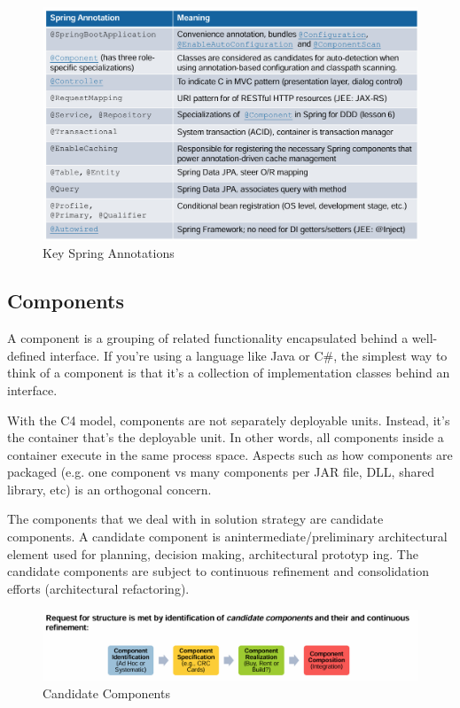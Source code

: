 \documentclass[../Main.tex]{subfiles}
\begin{document}
\begin{figure}[H]
    \centering
    \includegraphics[width=1\linewidth]{Images/spring-boot-annotations.png}
    \caption{Key Spring Annotations}
\end{figure}

\subsection{Components}
A component is a grouping of related functionality encapsulated behind a
well-defined interface. If you're using a language like Java or C\#,
the simplest way to think of a component is that it's a collection of
implementation classes behind an interface.

With the C4 model, components are not separately deployable units.
Instead, it's the container that's the deployable unit. In other words,
all components inside a container execute in the same process space.
Aspects such as how components are packaged (e.g. one component vs
many components per JAR file, DLL, shared library, etc) is an
orthogonal concern.

The components that we deal with in solution strategy are candidate components.
A candidate component is anintermediate/preliminary architectural element
used for planning, decision making, architectural prototyp ing.
The candidate components are subject to continuous refinement and
consolidation efforts (architectural refactoring).

\begin{figure}[H]
    \centering
    \includegraphics[width=1\linewidth]{Images/candidatecomponents.png}
    \caption{Candidate Components}
\end{figure}
\newpage
\end{document}
